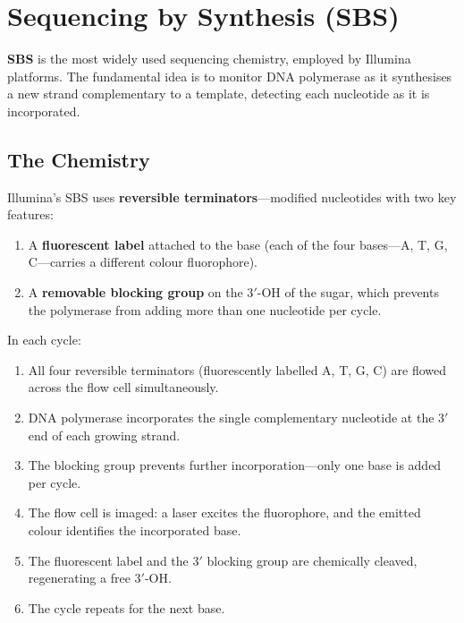 \section{Sequencing by Synthesis (SBS)}
\label{sec:seqprinciples:sbs}

\textbf{\Acrfull{SBS}} is the most widely used sequencing chemistry, employed by Illumina platforms. The fundamental idea is to monitor DNA polymerase as it synthesises a new strand complementary to a template, detecting each nucleotide as it is incorporated.

\subsection{The Chemistry}
\label{subsec:seqprinciples:sbs-chemistry}

Illumina's \acrshort{SBS} uses \textbf{reversible terminators}---modified nucleotides with two key features:

\begin{enumerate}[itemsep=2pt]
  \item A \textbf{fluorescent label} attached to the base (each of the four bases---A, T, G, C---carries a different colour fluorophore).
  \item A \textbf{removable blocking group} on the 3$'${}-OH of the sugar, which prevents the polymerase from adding more than one nucleotide per cycle.
\end{enumerate}

In each cycle:
\begin{enumerate}[itemsep=2pt]
  \item All four reversible terminators (fluorescently labelled A, T, G, C) are flowed across the flow cell simultaneously.
  \item DNA polymerase incorporates the single complementary nucleotide at the 3$'${} end of each growing strand.
  \item The blocking group prevents further incorporation---only one base is added per cycle.
  \item The flow cell is imaged: a laser excites the fluorophore, and the emitted colour identifies the incorporated base.
  \item The fluorescent label and the 3$'${} blocking group are chemically cleaved, regenerating a free 3$'${}-OH.
  \item The cycle repeats for the next base.
\end{enumerate}

